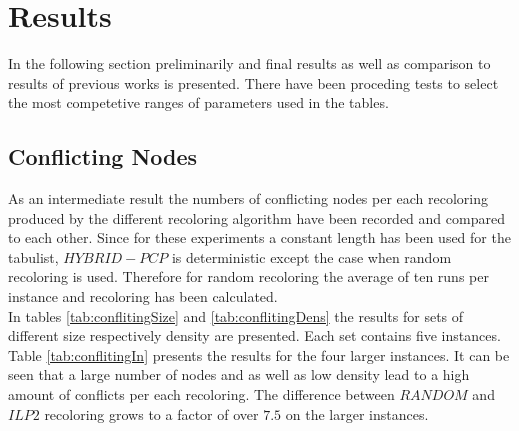 \section{Results}
In the following section preliminarily and final results as well as comparison to results of previous works is presented. There have been proceding tests to select the most competetive ranges of parameters used in the tables.

\subsection{Conflicting Nodes}
As an intermediate result the numbers of conflicting nodes per each recoloring produced by the different recoloring algorithm have been recorded and compared to each other. Since for these experiments a constant length has been used for the tabulist, $HYBRID-PCP$ is deterministic except the case when random recoloring is used. Therefore for random recoloring the average of ten runs per instance and recoloring has been calculated.\\
In tables \ref{tab:conflitingSize} and \ref{tab:conflitingDens} the results for sets of different size respectively density are presented. Each set contains five instances. Table \ref{tab:conflitingIn} presents the results for the four larger instances. It can be seen that a large number of nodes and as well as low density lead to a high amount of conflicts per each recoloring. The difference between $RANDOM$ and $ILP2$ recoloring grows to a factor of over $7.5$ on the larger instances.

\begin{table}[h]
\caption{conflitingSize}
\label{tab:conflitingSize}
\end{table}

